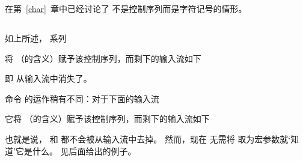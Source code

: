 \documentclass[letterpaper]{book}
\begin{document}
在第~\ref{char}~章中已经讨论了  不是控制序列而是字符记号的情形。

\subsection{\protect{}}

如上所述， 系列
\begin{disp}%
       \end{disp}
将 （的含义）赋予该控制序列，而剩下的输入流如下 
\begin{disp}\end{disp}
即  从输入流中消失了。

命令  的运作稍有不同：对于下面的输入流
\begin{disp}%
       \end{disp}
它将 （的含义）赋予该控制序列，而剩下的输入流如下
\begin{disp}\end{disp}
也就是说， 和  都不会被从输入流中去掉。
然而，现在  无需将  取为宏参数就`知道'它是什么。
见后面给出的例子。
\end{document}
